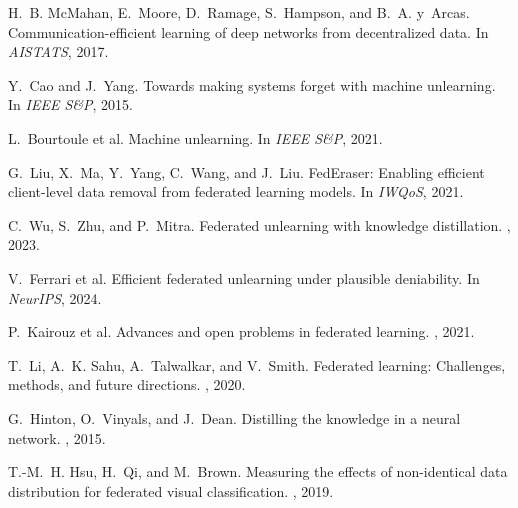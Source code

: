 \documentclass[11pt,a4paper]{article}
\begin{document}
\begin{thebibliography}{10}

H.~B. McMahan, E.~Moore, D.~Ramage, S.~Hampson, and B.~A. y~Arcas.
\newblock Communication-efficient learning of deep networks from decentralized data.
\newblock In {\em AISTATS}, 2017.

Y.~Cao and J.~Yang.
\newblock Towards making systems forget with machine unlearning.
\newblock In {\em IEEE S\&P}, 2015.

L.~Bourtoule et al.
\newblock Machine unlearning.
\newblock In {\em IEEE S\&P}, 2021.

G.~Liu, X.~Ma, Y.~Yang, C.~Wang, and J.~Liu.
\newblock FedEraser: Enabling efficient client-level data removal from federated learning models.
\newblock In {\em IWQoS}, 2021.

C.~Wu, S.~Zhu, and P.~Mitra.
\newblock Federated unlearning with knowledge distillation.
, 2023.

V.~Ferrari et al.
\newblock Efficient federated unlearning under plausible deniability.
\newblock In {\em NeurIPS}, 2024.

P.~Kairouz et al.
\newblock Advances and open problems in federated learning.
, 2021.

T.~Li, A.~K. Sahu, A.~Talwalkar, and V.~Smith.
\newblock Federated learning: Challenges, methods, and future directions.
, 2020.

G.~Hinton, O.~Vinyals, and J.~Dean.
\newblock Distilling the knowledge in a neural network.
, 2015.

T.-M.~H. Hsu, H.~Qi, and M.~Brown.
\newblock Measuring the effects of non-identical data distribution for federated visual classification.
, 2019.

\end{thebibliography}
\end{document}

